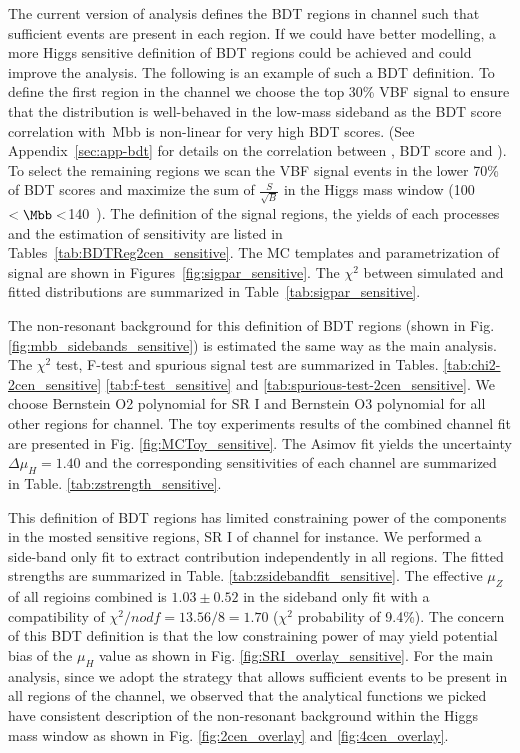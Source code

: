 The current version of analysis defines the BDT regions in \twocentral channel such that sufficient \zjets{} events are present in each region. If we could have better \zjets{} modelling, a more Higgs sensitive definition of BDT regions could be achieved and could improve the analysis. The following is an example of such a BDT definition.  To define the first region in the \twocentral channel we choose the top 30\% VBF signal to ensure that the \Mbb{} distribution is well-behaved in the low-mass sideband as the BDT score correlation with\ Mbb{} is non-linear for very high BDT scores. (See Appendix~\ref{sec:app-bdt} for details on the correlation between \Mbb, BDT score and \pTbb).  To select the remaining regions we scan the VBF signal events in the lower 70\% of  BDT scores and maximize the sum of $\frac{S}{\sqrt{B}}$ in the Higgs mass window (100~\GeV$<\Mbb<$140~\GeV). The definition of the signal regions, the yields of each processes and the estimation of sensitivity are listed in Tables~\ref{tab:BDTReg2cen_sensitive}. The MC templates and parametrization of signal are shown in Figures~\ref{fig:sigpar_sensitive}. The $\chi^2$ between simulated and fitted distributions are summarized in Table~\ref{tab:sigpar_sensitive}. 

The non-resonant background for this definition of BDT regions (shown in Fig. \ref{fig:mbb_sidebands_sensitive}) is estimated the same way as the main analysis. The $\chi^2$ test, F-test and spurious signal test are summarized in Tables. \ref{tab:chi2-2cen_sensitive} \ref{tab:f-test_sensitive} and \ref{tab:spurious-test-2cen_sensitive}. We choose Bernstein O2 polynomial for SR I and Bernstein O3 polynomial for all other regions for \twocentral channel. The toy experiments results of the combined channel fit are presented in Fig. \ref{fig:MCToy_sensitive}. The Asimov fit yields the uncertainty $\Delta \mu_{H} = 1.40$ and the corresponding \zjets{} sensitivities of each channel are summarized in Table. \ref{tab:zstrength_sensitive}. 

This definition of BDT regions has limited constraining power of the \zjets{} components in the mosted sensitive regions, SR I of \twocentral channel for instance. We performed a side-band only fit to extract \zjets{} contribution independently in all regions. The fitted \zjets{} strengths are summarized in Table. \ref{tab:zsidebandfit_sensitive}. The effective $\mu_{Z}$ of all regioins combined is $1.03\pm 0.52$ in the sideband only fit with a compatibility of $\chi^2/nodf = 13.56/8=1.70$ ($\chi^2$ probability of 9.4\%). The concern of this BDT definition is that the low constraining power of \zjets{} may yield potential bias of the $\mu_{H}$ value as shown in Fig. \ref{fig:SRI_overlay_sensitive}. For the main analysis, since we adopt the strategy that allows sufficient \zjets{} events to be present in all regions of the \twocentral channel, we observed that the analytical functions we picked have consistent description of the non-resonant background within the Higgs mass window as shown in Fig. \ref{fig:2cen_overlay} and \ref{fig:4cen_overlay}.

